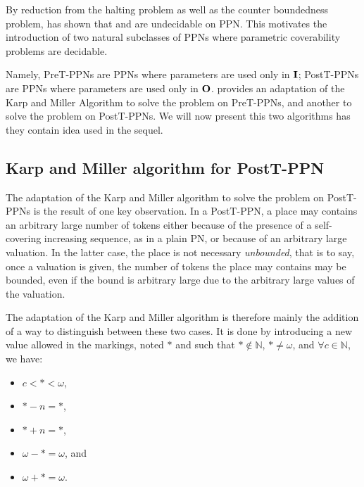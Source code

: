 \label{sec:preliminaries-ppn}

By reduction from the halting problem as well as the counter boundedness problem, \cite{David17} has shown that \Ucov and \Ecov are undecidable on \ac{PPN}.
This motivates the introduction of two natural subclasses of \acp{PPN} where parametric coverability problems are decidable.

Namely,
PreT-PPNs are \acp{PPN} where parameters are used only in $\mathbf{I}$;
PostT-PPNs are \acp{PPN} where parameters are used only in $\mathbf{O}$.
\cite{David17} provides an adaptation of the Karp and Miller Algorithm to solve the \Ucov problem on PreT-\acp{PPN}, and another to solve the \Ecov problem on PostT-\acp{PPN}.
We will now present this two algorithms has they contain idea used in the sequel.

\subsection{Karp and Miller algorithm for PostT-\ac{PPN}}

The adaptation of the Karp and Miller algorithm to solve the \Ecov problem on PostT-\acp{PPN} is the result of one key observation.
In a PostT-\ac{PPN}, a place may contains an arbitrary large number of tokens either because of the presence of a self-covering increasing sequence, as in a plain \ac{PN}, or because of an arbitrary large valuation.
In the latter case, the place is not necessary \emph{unbounded}, that is to say, once a valuation is given, the number of tokens the place may contains may be bounded, even if the bound is arbitrary large due to the arbitrary large values of the valuation.

The adaptation of the Karp and Miller algorithm is therefore mainly the addition of a way to distinguish between these two cases.
It is done by introducing a new value allowed in the markings, noted $*$ and such that $* \notin \mathbb{N}$, $* \neq \omega$, and $\forall c \in \mathbb{N}$, we have:
\begin{itemize}
  \item $c < * < \omega$,
  \item $* - n = *$,
  \item $* + n = *$,
  \item $\omega - * = \omega$, and
  \item $\omega + * = \omega$.
\end{itemize}


